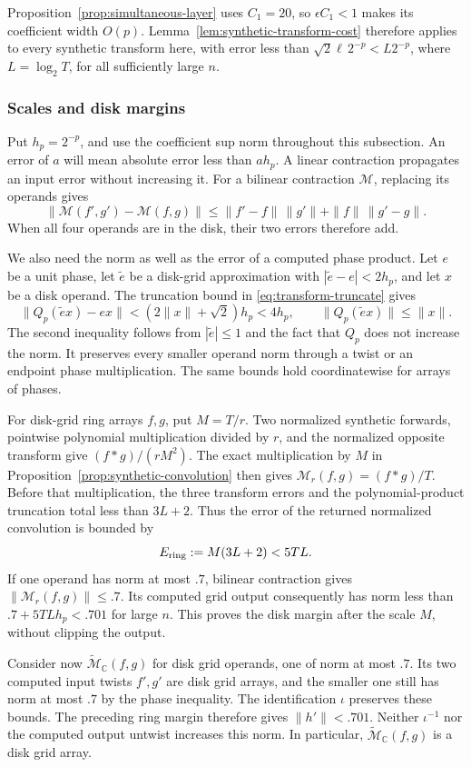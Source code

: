 Proposition~\ref{prop:simultaneous-layer} uses
$C_1=20$, so $\epsilon C_1<1$ makes its coefficient width $O(p)$.
Lemma~\ref{lem:synthetic-transform-cost} therefore applies to every
synthetic transform here, with error less than
$\sqrt2\ell\,2^{-p}<L2^{-p}$, where $L=\log_2T$, for all
sufficiently large $n$.

\subsubsection{Scales and disk margins}

Put $h_p=2^{-p}$, and use the coefficient sup norm throughout this
subsection.  An error of $a$ will mean absolute error less than $ah_p$.
A linear contraction propagates an input error without increasing it.
For a bilinear contraction $\mathcal M$, replacing its operands gives
\[
 \|\mathcal M(f',g')-\mathcal M(f,g)\|
 \le \|f'-f\|\,\|g'\|+\|f\|\,\|g'-g\|.
\]
When all four operands are in the disk, their two errors therefore add.

We also need the norm as well as the error of a computed phase product.
Let $e$ be a unit phase, let $\widetilde e$ be a disk-grid approximation
with $|\widetilde e-e|<2h_p$, and let $x$ be a disk operand.  The
truncation bound in \eqref{eq:transform-truncate} gives
\[
 \|Q_p(\widetilde e x)-ex\|
   <(2\|x\|+\sqrt2)h_p<4h_p,
 \qquad
 \|Q_p(\widetilde e x)\|\le\|x\|.
\]
The second inequality follows from $|\widetilde e|\le1$ and the fact
that $Q_p$ does not increase the norm.  It preserves every smaller
operand norm through a twist or an endpoint phase multiplication.
The same bounds hold coordinatewise for arrays of phases.

For disk-grid ring arrays $f,g$, put $M=T/r$.  Two normalized synthetic
forwards, pointwise polynomial multiplication divided by $r$, and the
normalized opposite transform give $(f*g)/(rM^2)$.  The exact
multiplication by $M$ in Proposition~\ref{prop:synthetic-convolution}
then gives $\mathcal M_r(f,g)=(f*g)/T$.  Before that multiplication,
the three transform errors and the polynomial-product truncation total
less than $3L+2$.  Thus the error of the returned normalized
convolution is bounded by
\[
 E_{\rm ring}:=M(3L+2)<5TL.
\]
If one operand has norm at most $.7$, bilinear contraction gives
$\|\mathcal M_r(f,g)\|\le.7$.  Its computed grid output consequently
has norm less than $.7+5TLh_p<.701$ for large $n$.  This proves the
disk margin after the scale $M$, without clipping the output.

Consider now $\widetilde{\mathcal M}_{\mathbb C}(f,g)$ for disk grid
operands, one of norm at most $.7$.  Its two computed input twists
$f',g'$ are disk grid arrays, and the smaller one still has norm at
most $.7$ by the phase inequality.  The identification $\iota$
preserves these bounds.  The preceding ring margin therefore gives
$\|h'\|<.701$.  Neither $\iota^{-1}$ nor the computed output untwist
increases this norm.  In particular,
$\widetilde{\mathcal M}_{\mathbb C}(f,g)$ is a disk grid array.

